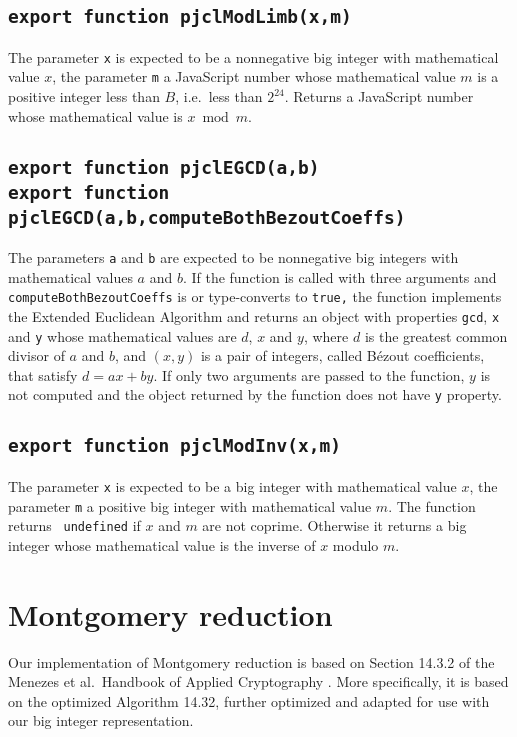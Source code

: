 \documentclass[12pt]{article}
\begin{document}
\subsection{\tt export function pjclModLimb(x,m)}

The parameter {\tt x} is expected to be a nonnegative big integer with
mathematical value $x$, the parameter {\tt m} a JavaScript number
whose mathematical value $m$ is a positive integer less than $B$, i.e.\ less than $2^{24}$.  Returns a
JavaScript number whose mathematical value is $x \bmod m$.

\subsection{\tt export function pjclEGCD(a,b)\\export function pjclEGCD(a,b,computeBothBezoutCoeffs)}

The parameters {\tt a} and {\tt b} are expected to be nonnegative big
integers with mathematical values $a$ and $b$.  If the function is
called with three arguments and {\tt computeBothBezoutCoeffs} is or
type-converts to {\tt true,} the function implements the Extended
Euclidean Algorithm and returns an object with properties {\tt gcd},
{\tt x} and {\tt y} whose mathematical values are $d$, $x$
and $y$, where $d$ is the greatest common divisor of $a$ and $b$, and
$(x,y)$ is a pair of integers, called B\'ezout coefficients, that
satisfy $d = ax + by$.  If only two arguments are passed to the
function, $y$ is not computed and the object returned by the function
does not have {\tt y} property.

\subsection{\tt export function pjclModInv(x,m)}

The parameter {\tt x} is expected to be a big integer with
mathematical value $x$, the parameter {\tt m} a positive big integer
with mathematical value $m$.  The function returns {\tt
  undefined} if $x$ and $m$ are not coprime.  Otherwise it returns a
big integer whose mathematical value is the inverse of $x$ modulo $m$.

\section{Montgomery reduction}
\label{s:montred}

Our implementation of Montgomery reduction is based on Section 14.3.2
of the Menezes et al.\ Handbook of Applied Cryptography
\cite{Menezes97handbookof}.  More specifically, it is based on the
optimized Algorithm 14.32, further optimized and adapted for use with
our big integer representation.
\end{document}
